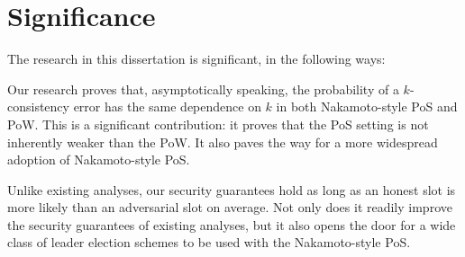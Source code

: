 

    





\section{Significance}



The research in this dissertation is significant, in the following ways:

  Our research proves that, asymptotically speaking, the probability of a $k$-consistency error 
  has the same dependence on $k$ in both Nakamoto-style PoS and PoW. 
  This is a significant contribution: 
  it proves that the PoS setting is not inherently weaker than the PoW. 
  It also paves the way for a more widespread adoption of Nakamoto-style PoS.

  Unlike existing analyses, 
  our security guarantees hold as long as 
  an honest slot is more likely than an adversarial slot on average. 
  Not only does it readily improve the security guarantees of existing analyses, 
  but it also opens the door for a wide class of leader election schemes to be used 
  with the Nakamoto-style PoS.


